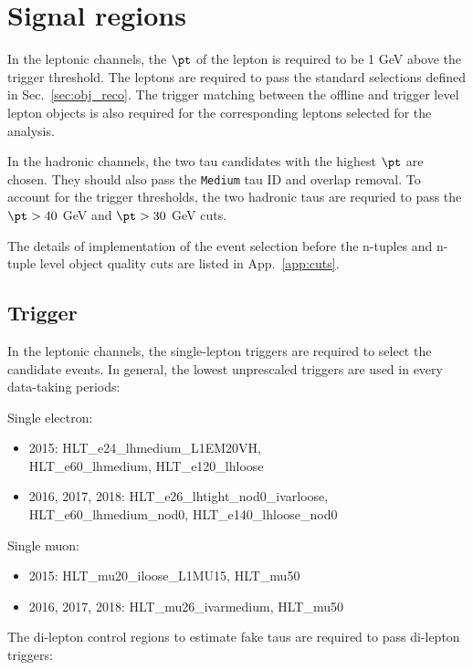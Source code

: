 \section{Signal regions}
\label{sec:selection}

In the leptonic channels, the $\pt$ of the lepton is required to be 1 GeV above the trigger threshold. The leptons are required to 
pass the standard selections defined in Sec.~\ref{sec:obj_reco}. The trigger matching between the offline and trigger level lepton objects is also required for the corresponding leptons selected for the analysis.

In the hadronic channels, the two tau candidates with the highest $\pt$ are chosen. They should also pass the \texttt{Medium} tau ID and overlap removal. To account for the trigger thresholds, the two hadronic taus are requried to pass the $\pt>40$ GeV and $\pt>30$ GeV cuts.

The details of implementation of the event selection before the n-tuples and n-tuple level object quality cuts are listed in App.~\ref{app:cuts}.

\subsection{Trigger}
\label{sec:trigger}

In the leptonic channels, the single-lepton triggers are required to select the candidate events. In general, the lowest unprescaled triggers are used in every data-taking periods:

Single electron:

\begin{itemize}
\item 2015: HLT\_e24\_lhmedium\_L1EM20VH,\\
HLT\_e60\_lhmedium, HLT\_e120\_lhloose
\item 2016, 2017, 2018: HLT\_e26\_lhtight\_nod0\_ivarloose,\\
HLT\_e60\_lhmedium\_nod0, HLT\_e140\_lhloose\_nod0
\end{itemize}

Single muon:

\begin{itemize}
\item 2015: HLT\_mu20\_iloose\_L1MU15, HLT\_mu50
\item 2016, 2017, 2018: HLT\_mu26\_ivarmedium, HLT\_mu50
\end{itemize}

The di-lepton control regions to estimate fake taus are required to pass di-lepton triggers:

